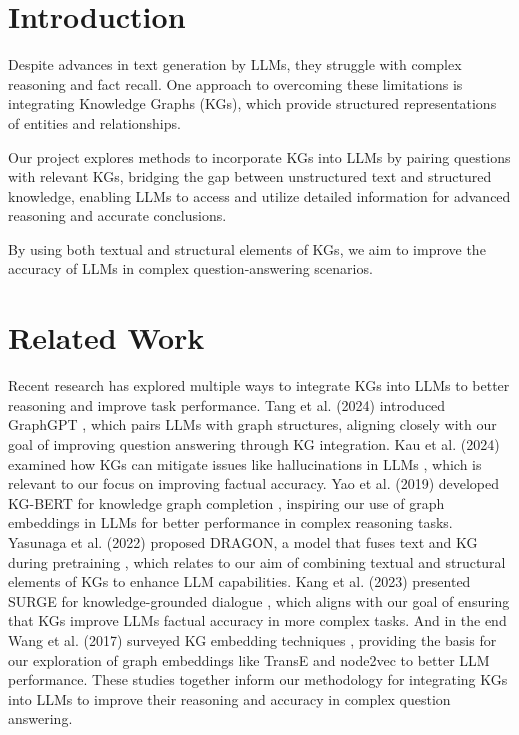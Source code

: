 \documentclass[fleqn,moreauthors,10pt]{ds_report}
\affiliation{\textit{Advisors: Slavko Žitnik}}
\begin{document}
\flushbottom 

\maketitle 
\thispagestyle{empty} 


\section*{Introduction}


Despite advances in text generation by LLMs, they struggle with complex reasoning and fact recall. One approach to overcoming these limitations is integrating Knowledge Graphs (KGs), which provide structured representations of entities and relationships.  

Our project explores methods to incorporate KGs into LLMs by pairing questions with relevant KGs, bridging the gap between unstructured text and structured knowledge, enabling LLMs to access and utilize detailed information for advanced reasoning and accurate conclusions.

By using both textual and structural elements of KGs, we aim to improve the accuracy of LLMs in complex question-answering scenarios.




\section*{Related Work}
Recent research has explored multiple ways to integrate KGs into LLMs to better reasoning and improve task performance. Tang et al. (2024) introduced GraphGPT \cite{tang2024graphgpt}, which pairs LLMs with graph structures, aligning closely with our goal of improving question answering through KG integration. Kau et al. (2024) examined how KGs can mitigate issues like hallucinations in LLMs \cite{kau2024combining}, which is relevant to our focus on improving factual accuracy. Yao et al. (2019) developed KG-BERT for knowledge graph completion \cite{yao2019kg}, inspiring our use of graph embeddings in LLMs for better performance in complex reasoning tasks. Yasunaga et al. (2022) proposed DRAGON, a model that fuses text and KG during pretraining \cite{yasunaga2022deep}, which relates to our aim of combining textual and structural elements of KGs to enhance LLM capabilities. Kang et al. (2023) presented SURGE for knowledge-grounded dialogue \cite{kang2023knowledge}, which aligns with our goal of ensuring that KGs improve LLMs factual accuracy in more complex tasks. And in the end Wang et al. (2017) surveyed KG embedding techniques \cite{wang2017knowledge}, providing the basis for our exploration of graph embeddings like TransE and node2vec to better LLM performance. These studies together inform our methodology for integrating KGs into LLMs to improve their reasoning and accuracy in complex question answering.
\end{document}
